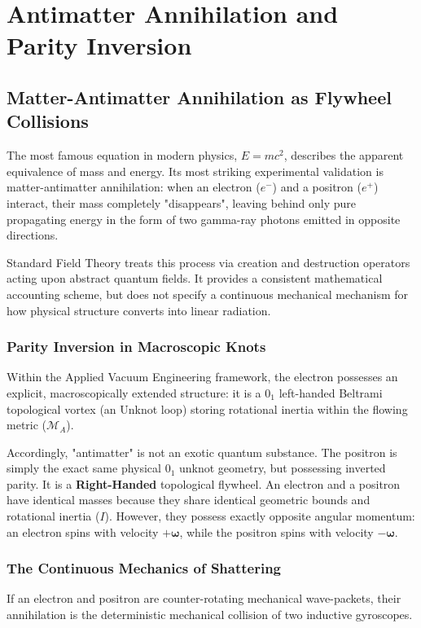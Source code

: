 \chapter{Antimatter Annihilation and Parity Inversion}
\label{ch:antimatter}

\section{Matter-Antimatter Annihilation as Flywheel Collisions}

The most famous equation in modern physics, $E=mc^2$, describes the apparent equivalence of mass and energy. Its most striking experimental validation is matter-antimatter annihilation: when an electron ($e^-$) and a positron ($e^+$) interact, their mass completely "disappears", leaving behind only pure propagating energy in the form of two gamma-ray photons emitted in opposite directions.

Standard Field Theory treats this process via creation and destruction operators acting upon abstract quantum fields. It provides a consistent mathematical accounting scheme, but does not specify a continuous mechanical mechanism for how physical structure converts into linear radiation.

\subsection{Parity Inversion in Macroscopic Knots}
Within the Applied Vacuum Engineering framework, the electron possesses an explicit, macroscopically extended structure: it is a $0_1$ left-handed Beltrami topological vortex (an Unknot loop) storing rotational inertia within the flowing metric ($\mathcal{M}_A$). 

Accordingly, "antimatter" is not an exotic quantum substance. The positron is simply the exact same physical $0_1$ unknot geometry, but possessing inverted parity. It is a \textbf{Right-Handed} topological flywheel. 
An electron and a positron have identical masses because they share identical geometric bounds and rotational inertia ($I$). However, they possess exactly opposite angular momentum: an electron spins with velocity $+\boldsymbol{\omega}$, while the positron spins with velocity $-\boldsymbol{\omega}$.

\subsection{The Continuous Mechanics of Shattering}
If an electron and positron are counter-rotating mechanical wave-packets, their annihilation is the deterministic mechanical collision of two inductive gyroscopes.

